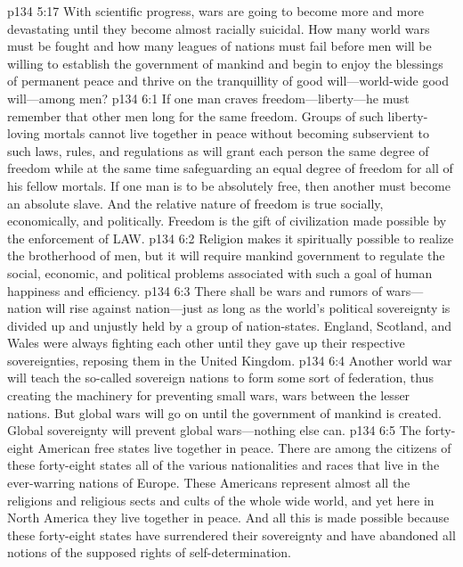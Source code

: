 \vs p134 5:17 With scientific progress, wars are going to become more and more devastating until they become almost racially suicidal. How many world wars must be fought and how many leagues of nations must fail before men will be willing to establish the government of mankind and begin to enjoy the blessings of permanent peace and thrive on the tranquillity of good will---world\hyp{}wide good will---among men?
\vs p134 6:1 If one man craves freedom---liberty---he must remember that  other men long for the same freedom. Groups of such liberty\hyp{}loving mortals cannot live together in peace without becoming subservient to such laws, rules, and regulations as will grant each person the same degree of freedom while at the same time safeguarding an equal degree of freedom for all of his fellow mortals. If one man is to be absolutely free, then another must become an absolute slave. And the relative nature of freedom is true socially, economically, and politically. Freedom is the gift of civilization made possible by the enforcement of LAW.
\vs p134 6:2 Religion makes it spiritually possible to realize the brotherhood of men, but it will require mankind government to regulate the social, economic, and political problems associated with such a goal of human happiness and efficiency.
\vs p134 6:3 There shall be wars and rumors of wars---nation will rise against nation---just as long as the world’s political sovereignty is divided up and unjustly held by a group of nation\hyp{}states. England, Scotland, and Wales were always fighting each other until they gave up their respective sovereignties, reposing them in the United Kingdom.
\vs p134 6:4 Another world war will teach the so\hyp{}called sovereign nations to form some sort of federation, thus creating the machinery for preventing small wars, wars between the lesser nations. But global wars will go on until the government of mankind is created. Global sovereignty will prevent global wars---nothing else can.
\vs p134 6:5 The forty\hyp{}eight American free states live together in peace. There are among the citizens of these forty\hyp{}eight states all of the various nationalities and races that live in the ever\hyp{}warring nations of Europe. These Americans represent almost all the religions and religious sects and cults of the whole wide world, and yet here in North America they live together in peace. And all this is made possible because these forty\hyp{}eight states have surrendered their sovereignty and have abandoned all notions of the supposed rights of self\hyp{}determination.\plusone

